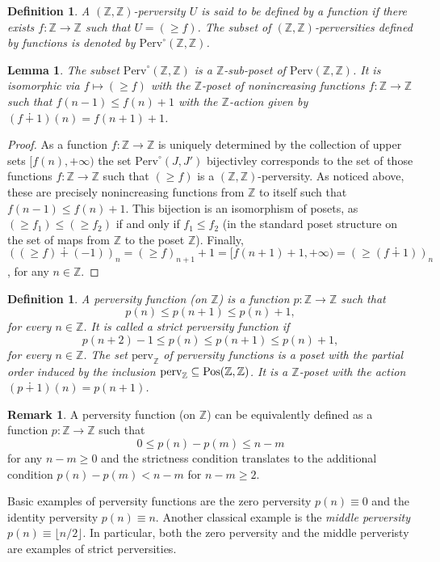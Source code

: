 \documentclass{article}
\newtheorem{lem}[thm]{Lemma}
\newtheorem{defn}[thm]{Definition}
\theoremstyle{definition}
\newtheorem{rem}[thm]{Remark}
\newcommand{\Z}{\mathbb{Z}}
\newcommand{\pos}{\textnormal{Pos}}
\begin{document}
\begin{defn}
A $(\Z,\Z)$-perversity $U$ is said to be defined by a function if there exists $f\colon \Z\to \Z$ such that $U=(\geq f)$. The subset of $(\Z,\Z)$-perversities defined by functions is denoted by $\mathrm{Perv}^\circ(\Z,\Z)$.
\end{defn}
\begin{lem}\label{lemma.perv0}
The subset $\mathrm{Perv}^\circ(\Z,\Z)$ is a $\Z$-sub-poset of $\mathrm{Perv}(\Z,\Z)$. It is isomorphic via $f\mapsto (\geq f)$ with the $\Z$-poset of nonincreasing functions $f\colon \Z\to \Z$ such that $f(n-1)\leq f(n)+1$ with the $\Z$-action given by $(f\dotplus 1)(n)=f(n+1)+1$.
\end{lem}
\begin{proof}
As a function $f\colon \Z\to \Z$ is uniquely determined by the collection of upper sets $[f(n),+\infty)$ the set $\mathrm{Perv}^\circ(J,J')$ bijectivley corresponds to the set of those functions $f\colon \Z\to \Z$ such that $(\geq f)$ is a $(\Z,\Z)$-perversity. As noticed above, these are precisely nonincreasing functions from $\Z$ to itself such that  $f(n-1)\leq f(n)+1$. This bijection is an isomorphism of posets, as $(\geq f_1)\leq (\geq f_2)$ if and only if $f_1\leq f_2$ (in the standard poset structure on the set of maps from $\Z$ to the poset $\Z$). Finally, $((\geq f)\dotplus (-1))_n=(\geq f)_{n+1}+1=[f(n+1)+1,+\infty)=(\geq (f\dotplus 1))_n$, for any $n\in \Z$.
\end{proof}

\begin{defn}\label{defperv}
A \emph{perversity function} (on $\Z$) is a function $p\colon \Z\to \Z$ such that
\[
p(n)\leq p(n+1)\leq p(n)+1,
\]
for every $n\in \Z$. It is called a strict perversity function if 
\[
p(n+2)-1\leq p(n)\leq p(n+1)\leq p(n)+1,
\]
for every $n\in \Z$. The set $\mathrm{perv}_\Z$ of perversity functions is a poset with the partial order induced by the inclusion $\mathrm{perv}_\Z\subseteq \pos(\Z,\Z)$. It is a $\Z$-poset with the action $(p\dotplus1)(n)=p(n+1)$. 
\end{defn}
\begin{rem}
A perversity function (on $\Z$) can be equivalently defined as a function $p\colon \Z\to \Z$ such that
\[
0\leq p(n)-p(m)\leq n-m
\]
for any $n-m\geq 0$ and the strictness condition translates to the additional condition $p(n)-p(m)< n-m$ for $n-m\geq 2$.

Basic examples of perversity functions are the zero perversity $p(n)\equiv 0$ and the identity perversity $p(n)\equiv n$. Another classical example is the \emph{middle perversity} $p(n)\equiv \lfloor n/2 \rfloor$. In particular, both the zero perversity and the middle perveristy are examples of strict perversities.
\end{rem}
\end{document}
